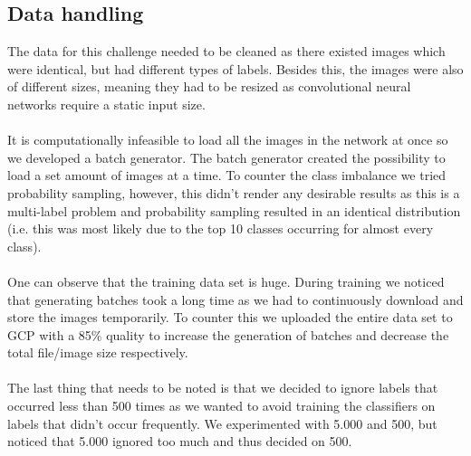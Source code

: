 \documentclass[10pt, a4paper]{article}
\begin{document}
\begin{multicols}{2}
		\section*{Data handling}
		The data for this challenge needed to be cleaned as there existed images which were identical, but had different types of labels. Besides this, the images were also of different sizes, meaning they had to be resized as convolutional neural networks require a static input size. 
		\\
		\\
		It is computationally infeasible to load all the images in the network at once so we developed a batch generator. The batch generator created the possibility to load a set amount of images at a time. To counter the class imbalance we tried probability sampling, however, this didn't render any desirable results as this is a multi-label problem and probability sampling resulted in an identical distribution (i.e. this was most likely due to the top 10 classes occurring for almost every class).
		\\
		\\
		One can observe that the training data set is huge. During training we noticed that generating batches took a long time as we had to continuously download and store the images temporarily. To counter this we uploaded the entire data set to GCP with a 85\% quality to increase the generation of batches and decrease the total file/image size respectively.
		\\
		\\
		The last thing that needs to be noted is that we decided to ignore labels that occurred less than 500 times as we wanted to avoid training the classifiers on labels that didn't occur frequently. We experimented with 5.000 and 500, but noticed that 5.000 ignored too much and thus decided on 500.
		

\end{multicols}
\end{document}
